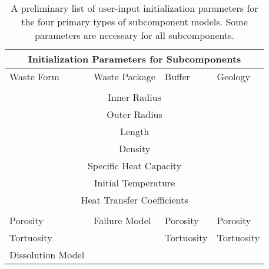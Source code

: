 %
\begin{table}
  \centering
  \footnotesize{
  \begin{tabularx}{\textwidth}{|l|l|l|l|}
    \multicolumn{4}{c}{\textbf{Initialization Parameters for Subcomponents}}\\
    \hline
    Waste Form & Waste Package & Buffer & Geology \\
    \hline
    \multicolumn{4}{|c|}{}\\
    \multicolumn{4}{|c|}{Inner Radius}\\
    \multicolumn{4}{|c|}{Outer Radius}\\
    \multicolumn{4}{|c|}{Length}\\
    \multicolumn{4}{|c|}{Density}\\
    \multicolumn{4}{|c|}{Specific Heat Capacity}\\
    \multicolumn{4}{|c|}{Initial Temperature}\\
    \multicolumn{4}{|c|}{Heat Transfer Coefficients}\\
    \multicolumn{4}{|c|}{}\\
    \hline
    Porosity           &  Failure Model & Porosity & Porosity \\
    Tortuosity         &                & Tortuosity & Tortuosity \\
    Dissolution Model  &                &           &  \\
    \hline
  \end{tabularx}
  \caption[Initialization Parameters for Subcomponents]{A preliminary list of 
  user-input initialization parameters for the four primary types of 
  subcomponent models. Some parameters are necessary for all subcomponents.}
  \label{tab:params}
  }
\end{table}


